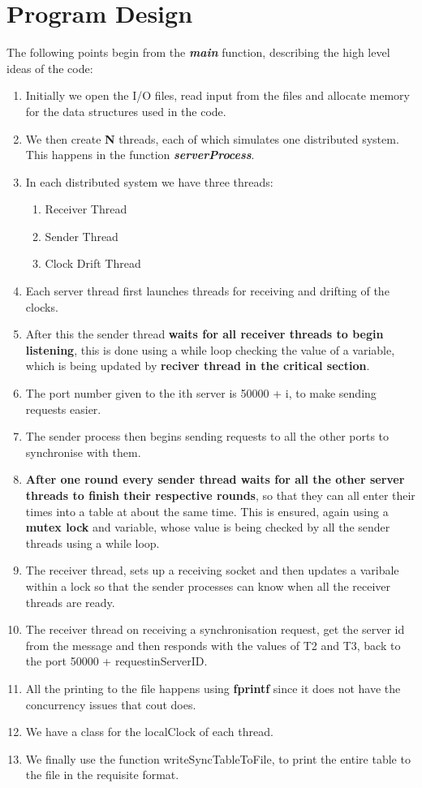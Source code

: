 \documentclass[a4paper,12pt]{report}
\begin{document}
\section{Program Design}
The following points begin from the \textit{\textbf{main}} function, describing the high level ideas of the code:
\begin{enumerate}
\item Initially we open the I/O files, read input from the files and allocate memory for the data structures used in the code.
\item We then create \textbf{N} threads, each of which simulates one distributed system. This happens in the function \textbf{\textit{serverProcess}}.
\item In each distributed system we have three threads:
\begin{enumerate}
\item Receiver Thread
\item Sender Thread
\item Clock Drift Thread
\end{enumerate}
\item Each server thread first launches threads for receiving and drifting of the clocks.
\item After this the sender thread \textbf{waits for all receiver threads to begin listening}, this is done using a while loop checking the value of a variable, which is being updated by \textbf{reciver thread in the critical section}.
\item The port number given to the ith server is 50000 + i, to make sending requests easier.
\item The sender process then begins sending requests to all the other ports to synchronise with them.
\item \textbf{After one round every sender thread waits for all the other server threads to finish their respective rounds}, so that they can all enter their times into a table at about the same time. This is ensured, again using a \textbf{mutex lock} and variable, whose value is being checked by all the sender threads using a while loop.
\item The receiver thread, sets up a receiving socket and then updates a varibale within a lock so that the sender processes can know when all the receiver threads are ready.
\item The receiver thread on receiving a synchronisation request, get the server id from the message and then responds with the values of T2 and T3, back to the port 50000 + requestinServerID.
\item All the printing to the file happens using \textbf{fprintf} since it does not have the concurrency issues that cout does.
\item We have a class for the localClock of each thread.
\item We finally use the function writeSyncTableToFile, to print the entire table to the file in the requisite format.
\end{enumerate}
\newpage
\end{document}
